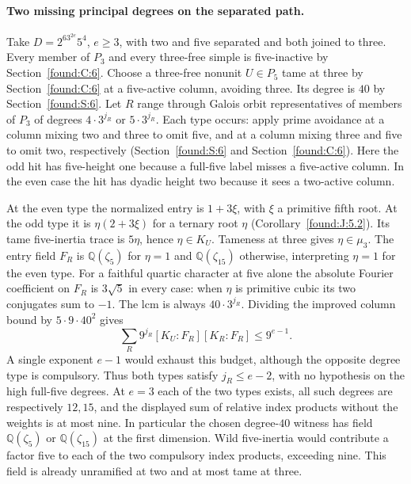 \documentclass[11pt,a4paper]{article}
\numberwithin{equation}{section}
\theoremstyle{remark}
\newcommand{\QQ}{\mathbb Q}
\begin{document}
\paragraph{Two missing principal degrees on the separated path.}
Take $D=2^63^{2e}5^4$, $e\ge3$, with two and five separated and both joined to three. Every member of $P_3$ and every three-free simple is five-inactive by Section~\ref{found:C:6}. Choose a three-free nonunit $U\in P_5$ tame at three by Section~\ref{found:C:6} at a five-active column, avoiding three. Its degree is $40$ by Section~\ref{found:S:6}. Let $R$ range through Galois orbit representatives of members of $P_3$ of degrees $4\cdot3^{j_R}$ or $5\cdot3^{j_R}$. Each type occurs: apply prime avoidance at a column mixing two and three to omit five, and at a column mixing three and five to omit two, respectively (Section~\ref{found:S:6} and Section~\ref{found:C:6}). Here the odd hit has five-height one because a full-five label misses a five-active column. In the even case the hit has dyadic height two because it sees a two-active column.

At the even type the normalized entry is $1+3\xi$, with $\xi$ a primitive fifth root. At the odd type it is $\eta(2+3\xi)$ for a ternary root $\eta$ (Corollary~\ref{found:J:5.2}). Its tame five-inertia trace is $5\eta$, hence $\eta\in K_U$. Tameness at three gives $\eta\in\mu_3$. The entry field $F_R$ is $\mathbb Q(\zeta_5)$ for $\eta=1$ and $\mathbb Q(\zeta_{15})$ otherwise, interpreting $\eta=1$ for the even type. For a faithful quartic character at five alone the absolute Fourier coefficient on $F_R$ is $3\sqrt5$ in every case: when $\eta$ is primitive cubic its two conjugates sum to $-1$. The lcm is always $40\cdot3^{j_R}$. Dividing the improved column bound by $5\cdot9\cdot40^2$ gives
\[
 \sum_R 9^{j_R}[K_U:F_R][K_R:F_R]\le 9^{e-1}.
\]
A single exponent $e-1$ would exhaust this budget, although the opposite degree type is compulsory. Thus both types satisfy $j_R\le e-2$, with no hypothesis on the high full-five degrees. At $e=3$ each of the two types exists, all such degrees are respectively $12,15$, and the displayed sum of relative index products without the weights is at most nine. In particular the chosen degree-$40$ witness has field $\QQ(\zeta_5)$ or $\QQ(\zeta_{15})$ at the first dimension. Wild five-inertia would contribute a factor five to each of the two compulsory index products, exceeding nine. This field is already unramified at two and at most tame at three.
\end{document}
